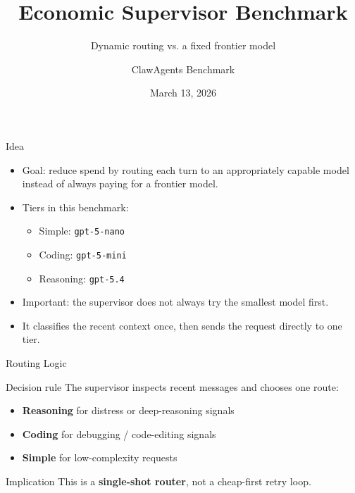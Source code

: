 \documentclass[aspectratio=169]{beamer}
\title{Economic Supervisor Benchmark}
\subtitle{Dynamic routing vs. a fixed frontier model}
\author{ClawAgents Benchmark}
\date{March 13, 2026}
\begin{document}
\begin{frame}
  \titlepage
\end{frame}

\begin{frame}{Idea}
  \begin{itemize}
    \item Goal: reduce spend by routing each turn to an appropriately capable model instead of always paying for a frontier model.
    \item Tiers in this benchmark:
    \begin{itemize}
      \item Simple: \texttt{gpt-5-nano}
      \item Coding: \texttt{gpt-5-mini}
      \item Reasoning: \texttt{gpt-5.4}
    \end{itemize}
    \item Important: the supervisor does not always try the smallest model first.
    \item It classifies the recent context once, then sends the request directly to one tier.
  \end{itemize}
\end{frame}

\begin{frame}{Routing Logic}
  \begin{block}{Decision rule}
    The supervisor inspects recent messages and chooses one route:
  \end{block}

  \begin{itemize}
    \item \textbf{Reasoning} for distress or deep-reasoning signals
    \item \textbf{Coding} for debugging / code-editing signals
    \item \textbf{Simple} for low-complexity requests
  \end{itemize}

  \vspace{0.5em}

  \begin{alertblock}{Implication}
    This is a \textbf{single-shot router}, not a cheap-first retry loop.
  \end{alertblock}
\end{frame}
\end{document}
